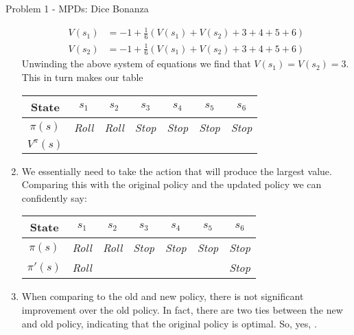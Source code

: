 \begin{problem}{Problem 1 - MPDs: Dice Bonanza}
\begin{highlight}
\begin{enumerate}[label=(\alph*)]
            \begin{align*}
                V(s_{1}) & = -1 + \frac{1}{6}(V(s_{1}) + V(s_{2}) + 3 + 4 + 5 + 6) \\
                V(s_{2}) & = -1 + \frac{1}{6}(V(s_{1}) + V(s_{2}) + 3 + 4 + 5 + 6)
            \end{align*}
            Unwinding the above system of equations we find that $V(s_{1}) = V(s_{2}) = 3$. This in turn makes our table
            \begin{center}
                \begin{tabular}[ht]{|c|c|c|c|c|c|c|}
                    \hline State & $s_{1}$ & $s_{2}$ & $s_{3}$ & $s_{4}$ & $s_{5}$ & $s_{6}$ \\ \hline
                    $\pi(s)$ & \textit{Roll} & \textit{Roll} & \textit{Stop} & \textit{Stop} & \textit{Stop} & \textit{Stop} \\ \hline
                    $V^{\pi}(s)$ & \color{green}{3} & \color{green}{3} & \color{green}{3} & \color{green}{4} & \color{green}{5} & \color{green}{6} \\ \hline
                \end{tabular}
            \end{center}
            \item We essentially need to take the action that will produce the largest value. Comparing this with the original policy and the updated policy we can confidently say:
            \begin{center}
                \begin{tabular}[ht]{|c|c|c|c|c|c|c|}
                    \hline State & $s_{1}$ & $s_{2}$ & $s_{3}$ & $s_{4}$ & $s_{5}$ & $s_{6}$ \\ \hline
                    $\pi(s)$ & \textit{Roll} & \textit{Roll} & \textit{Stop} & \textit{Stop} & \textit{Stop} & \textit{Stop} \\ \hline
                    $\pi'(s)$ & \textit{Roll} & \color{green}{Roll} & \color{green}{Roll / Stop} & \color{green}{Stop} & \color{green}{Stop} & \textit{Stop} \\ \hline
                \end{tabular}
            \end{center}
            \item When comparing to the old and new policy, there is not significant improvement over the old policy. In fact, there are two ties between the new and old policy, indicating that the 
            original policy is optimal. So, yes, \color{green}{the old policy is optimal}.
        \end{enumerate}
    \end{highlight}
\end{problem}

